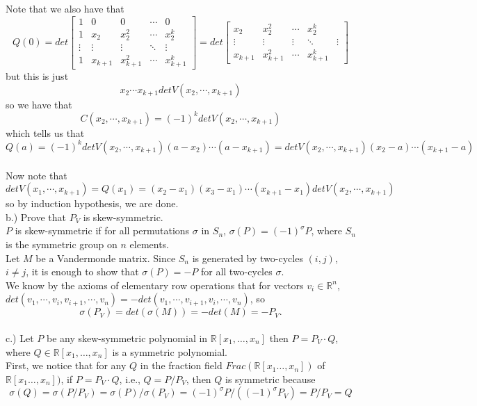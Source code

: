 \documentclass[12pt]{article}
\begin{document}
Note that we also have that
$$ Q(0) = det \begin{bmatrix} 1 & 0 & 0 & \cdots & 0 \\ 1 &x_2 & x_2^2 & \cdots & x_2^{k} \\ \vdots & \vdots & \vdots & \ddots & \vdots \\ 1 &x_{k+1} & x_{k+1}^2 & \cdots & x_{k+1}^{k} \end{bmatrix} = det \begin{bmatrix}  x_2 & x_2^2 & \cdots & x_2^{k} \\ \vdots & \vdots & \vdots & \ddots & \vdots \\ x_{k+1} & x_{k+1}^2 & \cdots & x_{k+1}^{k} \end{bmatrix}$$
but this is just
$$x_2 \cdots x_{k+1} det V(x_2, \cdots , x_{k+1})$$
so we have that
$$C(x_2, \cdots, x_{k+1}) = (-1)^k det V(x_2, \cdots , x_{k+1})$$
which tells us that
$$Q(a) = (-1)^k det V(x_2, \cdots , x_{k+1}) (a - x_2) \cdots (a - x_{k+1}) = det V(x_2, \cdots , x_{k+1}) (x_2 - a) \cdots (x_{k+1} - a)$$\\

Now note that 
$$det V(x_1, \cdots, x_{k+1}) = Q(x_1) = (x_2 - x_1)(x_3 - x_1) \cdots (x_{k+1} - x_1) det V(x_2, \cdots, x_{k+1})$$
so by induction hypothesis, we are done. \\

b.) Prove that $P_V$ is skew-symmetric. \\

$P$ is skew-symmetric if for all permutations $\sigma$ in $S_n$,
$\sigma(P) = (-1)^\sigma P$, where $S_n$ is the symmetric group on $n$ elements. \\

Let $M$ be a Vandermonde matrix. Since $S_n$ is generated by two-cycles $(i, j)$, $i \neq j$, it is enough to show that $\sigma(P) = -P$ for all two-cycles $\sigma$. \\

We know by the axioms of elementary row operations that for vectors $v_i \in \mathbb{R}^n$, $det(v_1, \cdots, v_i, v_{i+1}, \cdots, v_n) = -det(v_1, \cdots, v_{i+1}, v_i, \cdots, v_n)$, so $$\sigma(P_V)= det(\sigma(M)) =  -det(M) = -P_V.$$\\

c.) Let $P$ be any skew-symmetric polynomial in $\mathbb{R}[x_1, \dots, x_n]$ then $P = P_V \cdot Q$, where $Q \in \mathbb{R}[x_1, \dots, x_n]$ is a symmetric polynomial.\\

First, we notice that for any $Q$ in the fraction field $Frac(\mathbb{R}[x_1…, x_n])$ of $\mathbb{R}[x_1…, x_n])$, if $P = P_V\cdot Q$, i.e., $Q = P/P_V$, then $Q$ is symmetric because 
$$\sigma(Q)  = \sigma(P/P_V ) = \sigma(P)/\sigma(P_V) 
= (-1)^\sigma P / ( (-1)^\sigma P_V) = P/P_V = Q$$\\
\end{document}
